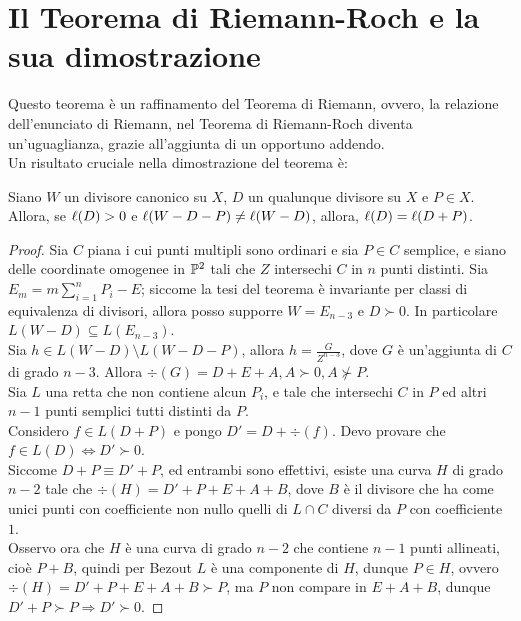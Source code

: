\chapter{Il Teorema di Riemann-Roch e la sua dimostrazione}
    Questo teorema è un raffinamento del Teorema di Riemann, ovvero, 
    la relazione dell'enunciato di Riemann, nel Teorema di Riemann-Roch 
    diventa un'uguaglianza, grazie all'aggiunta di un opportuno addendo. \\
    Un risultato cruciale nella dimostrazione del teorema è: 
    \begin{lemma}
        Siano $W$ un divisore canonico su $X$, $D$ un qualunque divisore su $X$ e $P \in X$. 
        Allora, se $\l(D) > 0$ e $\l(W-D-P) \neq \l(W-D)$, allora, $\l(D) = \l(D+P)$.
    \end{lemma}
    \begin{proof}
        Sia $C$ piana i cui punti multipli sono ordinari e sia $P \in C$ semplice, e siano delle coordinate 
        omogenee in $\P^2$ tali che $Z$ intersechi $C$ in $n$ punti distinti. Sia $E_m = m \sum_{i=1}^n P_i - E$; 
        siccome la tesi del teorema è invariante per classi di equivalenza di divisori, allora posso supporre $W = E_{n-3}$ 
        e $D \succ 0$. In particolare $L(W-D) \subseteq L(E_{n-3})$.\\
        Sia $h \in L(W-D) \setminus L(W-D-P)$, allora $h = \frac{G}{Z^{n-3}}$, dove $G$ è un'aggiunta di $C$ di grado $n-3$. Allora $\div(G) 
        = D + E + A, A \succ 0, A \not\succ P$.\\
        Sia $L$ una retta che non contiene alcun $P_i$, e tale che intersechi $C$ in $P$ ed altri $n-1$ punti semplici tutti distinti da $P$. \\
        Considero $f \in L(D+P)$ e pongo $D' = D + \div(f)$. Devo provare che $f \in L(D) \iff D' \succ 0$.\\
        Siccome $D + P \equiv D' + P$, ed entrambi sono effettivi, esiste una curva $H$ di grado $n-2$ tale che $\div(H) = D'+P + E + A+B$, dove $B$ 
        è il divisore che ha come unici punti con coefficiente non nullo quelli di $L \cap C$ diversi da $P$ con coefficiente $1$.\\
        Osservo ora che $H$ è una curva di grado $n-2$ che contiene $n-1$ punti allineati, cioè $P + B$, quindi per Bezout $L$ è una componente di $H$, 
        dunque $P \in H$, ovvero $\div(H) = D' + P + E + A + B \succ P$, ma $P$ non compare in $E + A + B$, dunque $D' + P \succ P \Longrightarrow D' \succ 0$.
    \end{proof}
